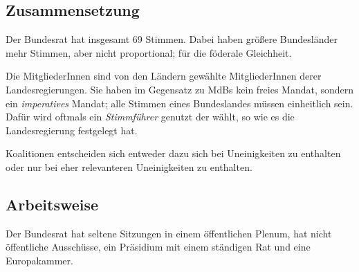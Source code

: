 \documentclass{article}
\begin{document}
\subsection{Zusammensetzung}
Der Bundesrat hat insgesamt 69 Stimmen. Dabei haben größere Bundesländer mehr Stimmen, aber nicht proportional; für die föderale Gleichheit.

Die MitgliederInnen sind von den Ländern gewählte MitgliederInnen derer Landesregierungen. Sie haben im Gegensatz zu MdBs kein freies Mandat, sondern ein \emph{imperatives} Mandat; alle Stimmen eines Bundeslandes müssen einheitlich sein. Dafür wird oftmals ein \sog \emph{Stimmführer} genutzt der wählt, so wie es die Landesregierung festgelegt hat.

Koalitionen entscheiden sich \idr entweder dazu sich bei Uneinigkeiten zu enthalten oder nur bei eher relevanteren Uneinigkeiten zu enthalten.

\subsection{Arbeitsweise}
Der Bundesrat hat seltene Sitzungen in einem öffentlichen Plenum, hat nicht öffentliche Ausschüsse, ein Präsidium mit einem ständigen Rat und eine Europakammer.
\end{document}
